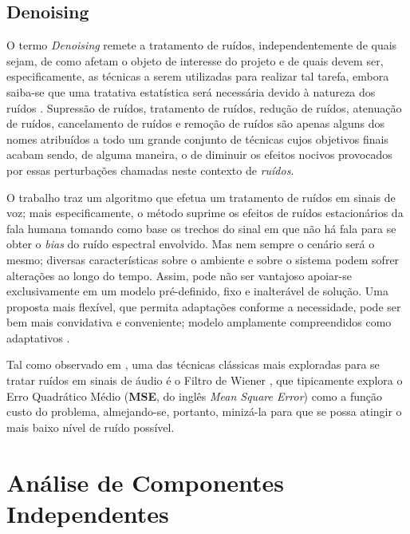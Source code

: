 \subsection{Denoising}
\label{subsec:bss_denoising}

O termo \textit{Denoising} remete a tratamento de ruídos, independentemente de quais sejam, de como afetam o objeto de interesse do projeto e de quais devem ser, especificamente, as técnicas a serem utilizadas para realizar tal tarefa, embora saiba-se que uma tratativa estatística será necessária devido à natureza dos ruídos \citep{watkinson2001art}. Supressão de ruídos, tratamento de ruídos, redução de ruídos, atenuação de ruídos, cancelamento de ruídos e remoção de ruídos são apenas alguns dos nomes atribuídos a todo um grande conjunto de técnicas cujos objetivos finais acabam sendo, de alguma maneira, o de diminuir os efeitos nocivos provocados por essas perturbações chamadas neste contexto de \textit{ruídos}.

O trabalho \citep{1163209} traz um algoritmo que efetua um tratamento de ruídos em sinais de voz; mais especificamente, o método suprime os efeitos de ruídos estacionários da fala humana tomando como base os trechos do sinal em que não há fala para se obter o \textit{bias} do ruído espectral envolvido. Mas nem sempre o cenário será o mesmo; diversas características sobre o ambiente e sobre o sistema podem sofrer alterações ao longo do tempo. Assim, pode não ser vantajoso apoiar-se exclusivamente em um modelo pré-definido, fixo e inalterável de solução. Uma proposta mais flexível, que permita adaptações conforme a necessidade, pode ser bem mais convidativa e conveniente; modelo amplamente compreendidos como adaptativos \citep{1451965, 382009}.

Tal como observado em \citep{7805139, 6334422, 1643650, SPRIET20042367}, uma das técnicas clássicas mais exploradas para se tratar ruídos em sinais de áudio é o Filtro de Wiener \citep{6284754}, que tipicamente explora o Erro Quadrático Médio (\textbf{MSE}, do inglês \textit{Mean Square Error}) como a função custo do problema, almejando-se, portanto, minizá-la para que se possa atingir o mais baixo nível de ruído possível.





\section{Análise de Componentes Independentes}
\label{sec:bss_ica}

